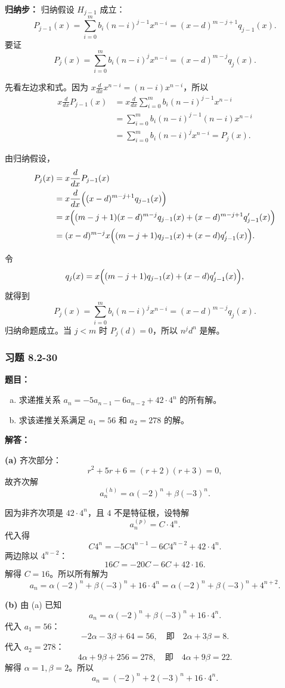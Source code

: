 \documentclass[11pt,UTF8]{article}
\begin{document}
\textbf{归纳步：} 归纳假设 $H_{j-1}$ 成立：
\[ P_{j-1}(x)=\sum_{i=0}^{m}b_i(n-i)^{j-1}x^{n-i}=(x-d)^{m-j+1}q_{j-1}(x). \]
要证
\[ P_j(x)=\sum_{i=0}^{m}b_i(n-i)^jx^{n-i}=(x-d)^{m-j}q_j(x). \]

先看左边求和式。因为 $x\frac{d}{dx}x^{n-i}=(n-i)x^{n-i}$，所以
\begin{align*}
x\frac{d}{dx}P_{j-1}(x) &= x\frac{d}{dx}\sum_{i=0}^{m}b_i(n-i)^{j-1}x^{n-i} \\
&= \sum_{i=0}^{m}b_i(n-i)^{j-1}(n-i)x^{n-i} \\
&= \sum_{i=0}^{m}b_i(n-i)^jx^{n-i}=P_j(x).
\end{align*}

由归纳假设，
\begin{align*}
P_j(x) &= x\frac{d}{dx}P_{j-1}(x) \\
&= x\frac{d}{dx}\Bigl((x-d)^{m-j+1}q_{j-1}(x)\Bigr) \\
&= x\Bigl((m-j+1)(x-d)^{m-j}q_{j-1}(x)+(x-d)^{m-j+1}q_{j-1}'(x)\Bigr) \\
&= (x-d)^{m-j}x\Bigl((m-j+1)q_{j-1}(x)+(x-d)q_{j-1}'(x)\Bigr).
\end{align*}

令
\[ q_j(x)=x\Bigl((m-j+1)q_{j-1}(x)+(x-d)q_{j-1}'(x)\Bigr), \]
就得到
\[ P_j(x)=\sum_{i=0}^{m}b_i(n-i)^jx^{n-i}=(x-d)^{m-j}q_j(x). \]
归纳命题成立。当 $j<m$ 时 $P_j(d)=0$，所以 $n^jd^n$ 是解。

\subsubsection*{习题 8.2-30}
\textbf{题目：}
\begin{enumerate}[a)]
    \item 求递推关系 $a_n=-5a_{n-1}-6a_{n-2}+42\cdot 4^n$ 的所有解。
    \item 求该递推关系满足 $a_1=56$ 和 $a_2=278$ 的解。
\end{enumerate}

\textbf{解答：}

\textbf{(a)} 齐次部分：
\[ r^2+5r+6=(r+2)(r+3)=0, \]
故齐次解
\[ a_n^{(h)}=\alpha(-2)^n+\beta(-3)^n. \]

因为非齐次项是 $42\cdot 4^n$，且 $4$ 不是特征根，设特解
\[ a_n^{(p)}=C\cdot 4^n. \]
代入得
\[ C4^n=-5C4^{n-1}-6C4^{n-2}+42\cdot 4^n. \]
两边除以 $4^{n-2}$：
\[ 16C=-20C-6C+42\cdot 16. \]
解得 $C=16$。所以所有解为
\[ \boxed{a_n=\alpha(-2)^n+\beta(-3)^n+16\cdot 4^n=\alpha(-2)^n+\beta(-3)^n+4^{n+2}.} \]

\textbf{(b)} 由 (a) 已知
\[ a_n=\alpha(-2)^n+\beta(-3)^n+16\cdot 4^n. \]
代入 $a_1=56$：
\[ -2\alpha-3\beta+64=56,\quad\text{即}\quad 2\alpha+3\beta=8. \]
代入 $a_2=278$：
\[ 4\alpha+9\beta+256=278,\quad\text{即}\quad 4\alpha+9\beta=22. \]
解得 $\alpha=1,\beta=2$。所以
\[ \boxed{a_n=(-2)^n+2(-3)^n+16\cdot 4^n.} \]
\end{document}
